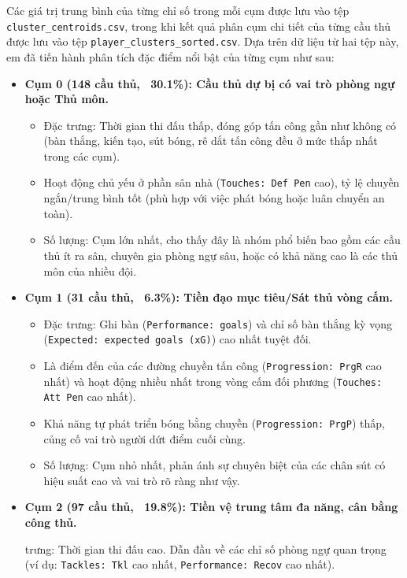 \documentclass[12pt, a4paper]{report}
\begin{document}
Các giá trị trung bình của từng chỉ số trong mỗi cụm được lưu vào tệp \texttt{cluster\_centroids.csv}, trong khi kết quả phân cụm chi tiết của từng cầu thủ được lưu vào tệp \texttt{player\_clusters\_sorted.csv}.
Dựa trên dữ liệu từ hai tệp này, em đã tiến hành phân tích đặc điểm nổi bật của từng cụm như sau:
\begin{itemize}
    \item \textbf{Cụm 0 (148 cầu thủ, ~30.1\%): Cầu thủ dự bị có vai trò phòng ngự hoặc Thủ môn.}
    \begin{itemize}
        \item Đặc trưng: Thời gian thi đấu thấp, đóng góp tấn công gần như không có (bàn thắng, kiến tạo, sút bóng, rê dắt tấn công đều ở mức thấp nhất trong các cụm).
        \item Hoạt động chủ yếu ở phần sân nhà (\texttt{Touches: Def Pen} cao), tỷ lệ chuyền ngắn/trung bình tốt (phù hợp với việc phát bóng hoặc luân chuyển an toàn).
        \item Số lượng: Cụm lớn nhất, cho thấy đây là nhóm phổ biến bao gồm các cầu thủ ít ra sân, chuyên gia phòng ngự sâu, hoặc có khả năng cao là các thủ môn của nhiều đội.
    \end{itemize}
    \item \textbf{Cụm 1 (31 cầu thủ, ~6.3\%): Tiền đạo mục tiêu/Sát thủ vòng cấm.}
    \begin{itemize}
        \item Đặc trưng: Ghi bàn (\texttt{Performance: goals}) và chỉ số bàn thắng kỳ vọng (\texttt{Expected: expected goals (xG)}) cao nhất tuyệt đối.
        \item Là điểm đến của các đường chuyền tấn công (\texttt{Progression: PrgR} cao nhất) và hoạt động nhiều nhất trong vòng cấm đối phương (\texttt{Touches: Att Pen} cao nhất).
        \item Khả năng tự phát triển bóng bằng chuyền (\texttt{Progression: PrgP}) thấp, củng cố vai trò người dứt điểm cuối cùng.
        \item Số lượng: Cụm nhỏ nhất, phản ánh sự chuyên biệt của các chân sút có hiệu suất cao và vai trò rõ ràng như vậy.
    \end{itemize}
    \item \textbf{Cụm 2 (97 cầu thủ, ~19.8\%): Tiền vệ trung tâm đa năng, cân bằng công thủ.}
    \begin{itemize}
         trưng: Thời gian thi đấu cao. Dẫn đầu về các chỉ số phòng ngự quan trọng (ví dụ: \texttt{Tackles: Tkl} cao nhất, \texttt{Performance: Recov} cao nhất).

\end{itemize}
\end{itemize}
\end{document}
